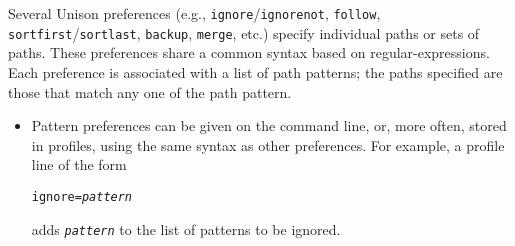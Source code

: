 \documentclass{article}
\newcommand{\ARG}[1]{\texttt{\textit{#1}}}
\begin{document}
Several Unison preferences (e.g., \verb|ignore|/\verb|ignorenot|,
\verb|follow|, \verb|sortfirst|/\verb|sortlast|, \verb|backup|,
\verb|merge|, etc.)
specify individual paths or sets of paths.  These preferences share a
common syntax based on regular-expressions.  Each preference
is associated with a list of path patterns; the paths specified are those
that match any one of the path pattern.

\begin{itemize}
\item Pattern preferences can be given on the command line,
  or, more often, stored in profiles, using the same syntax as other preferences.  
  For example, a profile line of the form
\begin{alltt}
             ignore = \ARG{pattern}
\end{alltt}
adds \ARG{pattern} to the list of patterns to be ignored.


\end{itemize}
\end{document}
